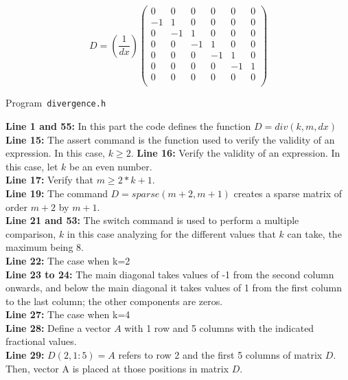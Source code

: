 \begin{equation}
	D= (\frac{1}{dx})\begin{pmatrix}
		0  & 0  & 0  & 0  & 0  & 0 \\
		-1 & 1  & 0  & 0  & 0  & 0 \\
		0  & -1 & 1  & 0  & 0  & 0 \\
		0  & 0  & -1 & 1  & 0  & 0 \\
		0  & 0  & 0  & -1 & 1  & 0 \\
		0  & 0  & 0  & 0  & -1 & 1 \\
		0  & 0  & 0  & 0  & 0  & 0 \\
	\end{pmatrix}
\end{equation}

\begin{cpplisting}
	\tiny
	\centering
	\caption{Program~\texttt{divergence.h}}
	\label{code:divergence.h}
\end{cpplisting}

\textbf{Line 1 and 55:} In this part the code defines the function $D = div(k, m, dx)$\\
\textbf{Line 15:} The assert command is the function used to verify the validity of an expression. In this case, $k \geq 2$.
\textbf{Line 16:} Verify the validity of an expression. In this case, let $k$ be an even number.\\
\textbf{Line 17:} Verify that $m \geq 2*k+1$.\\
\textbf{Line 19:} The command $D = sparse(m+2, m+1)$ creates a sparse matrix of order $m+2$ by $m+1$.\\
\textbf{Line 21 and 53:} The switch command is used to perform a multiple comparison, $k$ in this case analyzing for the different values ​​that $k$ can take, the maximum being 8.\\
\textbf{Line 22:} The case when k=2\\
\textbf{Line 23 to 24:}  The main diagonal takes values ​​of -1 from the second column onwards, and below the main diagonal it takes values ​​of 1 from the first column to the last column; the other components are zeros.\\
\textbf{Line 27:} The case when k=4\\

\textbf{Line 28:} Define a vector $A$ with 1 row and 5 columns with the indicated fractional values.\\

\textbf{Line 29:} $D(2, 1:5) = A$ refers to row 2 and the first 5 columns of matrix $D$. Then, vector A is placed at those positions in matrix $D$.\\

